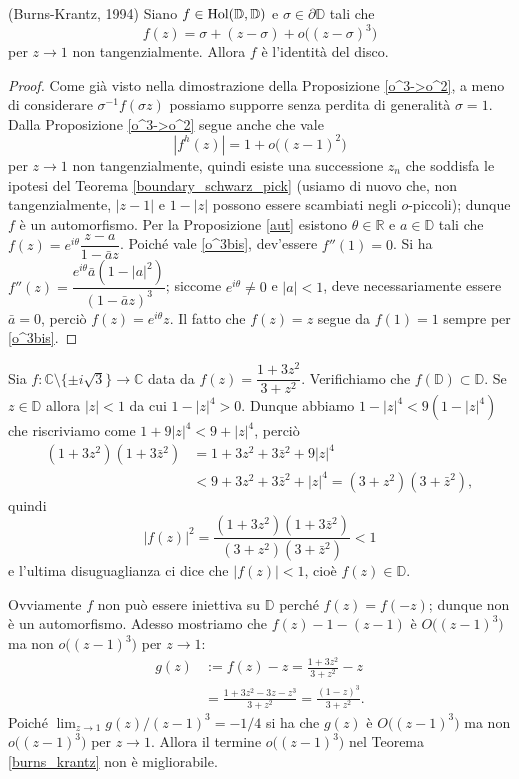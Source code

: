 \begin{thm} \label{burns_krantz}
  (Burns-Krantz, 1994) Siano $f \in \text{\normalfont{Hol}}(\mathbb{D},\mathbb{D})$ e $\sigma \in \partial\mathbb{D}$ tali che
  \begin{equation} \label{o^3bis}
    f(z)=\sigma+(z-\sigma)+o\bigl((z-\sigma)^3\bigr)
  \end{equation}
  per $z \longrightarrow 1$ non tangenzialmente. Allora $f$ è l'identità del disco.
\end{thm}

\begin{proof}
  Come già visto nella dimostrazione della Proposizione \ref{o^3->o^2}, a meno di considerare $\sigma^{-1}f(\sigma z)$ possiamo supporre senza perdita di generalità $\sigma=1$.
  Dalla Proposizione \ref{o^3->o^2} segue anche che vale
  $$|f^h(z)|=1+o\bigl((z-1)^2\bigr)$$
  per $z \longrightarrow 1$ non tangenzialmente, quindi esiste una successione $z_n$ che soddisfa le ipotesi del Teorema \ref{boundary_schwarz_pick} (usiamo di nuovo che, non tangenzialmente, $|z-1|$ e $1-|z|$ possono essere scambiati negli $o$-piccoli); dunque $f$ è un automorfismo.
  Per la Proposizione \ref{aut} esistono $\theta \in \mathbb{R}$ e $a \in \mathbb{D}$ tali che $f(z)=e^{i\theta}\dfrac{z-a}{1-\bar{a}z}$. Poiché vale \eqref{o^3bis}, dev'essere $f''(1)=0$. Si ha $f''(z)=\dfrac{e^{i\theta}\bar{a}(1-|a|^2)}{(1-\bar{a}z)^3}$;
  siccome $e^{i\theta}\not=0$ e $|a|<1$, deve necessariamente essere $\bar{a}=0$, perciò $f(z)=e^{i\theta}z$. Il fatto che $f(z)=z$ segue da $f(1)=1$ sempre per \eqref{o^3bis}.
\end{proof}

\begin{ex}
  Sia $f:\mathbb{C}\setminus\{\pm i\sqrt{3}\} \longrightarrow \mathbb{C}$ data da $f(z)=\dfrac{1+3z^2}{3+z^2}$. Verifichiamo che $f(\mathbb{D}) \subset \mathbb{D}$. Se $z \in \mathbb{D}$ allora $|z|<1$ da cui $1-|z|^4>0$.
  Dunque abbiamo $1-|z|^4 < 9(1-|z|^4)$ che riscriviamo come $1+9|z|^4 < 9+|z|^4$, perciò
  \begin{align*}
    (1+3z^2)(1+3\bar{z}^2) &=1+3z^2+3\bar{z}^2+9|z|^4 \\
    & < 9+3z^2+3\bar{z}^2+|z|^4=(3+z^2)(3+\bar{z}^2),
  \end{align*}
  quindi
  $$|f(z)|^2=\frac{(1+3z^2)(1+3\bar{z}^2)}{(3+z^2)(3+\bar{z}^2)} < 1$$
  e l'ultima disuguaglianza ci dice che $|f(z)|<1$, cioè $f(z) \in \mathbb{D}$.

  Ovviamente $f$ non può essere iniettiva su $\mathbb{D}$ perché $f(z)=f(-z)$; dunque non è un automorfismo. Adesso mostriamo che $f(z)-1-(z-1)$ è $O\bigl((z-1)^3\bigr)$ ma non $o\bigl((z-1)^3\bigr)$ per $z \longrightarrow 1$:
  \begin{align*}
    g(z) & := f(z)-z=\frac{1+3z^2}{3+z^2}-z \\
    & =\frac{1+3z^2-3z-z^3}{3+z^2}=\frac{(1-z)^3}{3+z^2}.
  \end{align*}
  Poiché $\displaystyle \lim_{z \longrightarrow 1} g(z)/(z-1)^3=-1/4$ si ha che $g(z)$ è $O\bigl((z-1)^3\bigr)$ ma non $o\bigl((z-1)^3\bigr)$ per $z \longrightarrow 1$. Allora il termine $o\bigl((z-1)^3\bigr)$ nel Teorema \ref{burns_krantz} non è migliorabile.
\end{ex}
